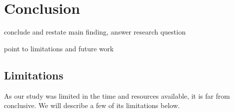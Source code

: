 
\chapter{Conclusion}
\label{ch:conclusion}

conclude and restate main finding, answer research question

point to limitations and future work

\section{Limitations}
As our study was limited in the time and resources available, it is far from conclusive. We will describe a few of its limitations below.
